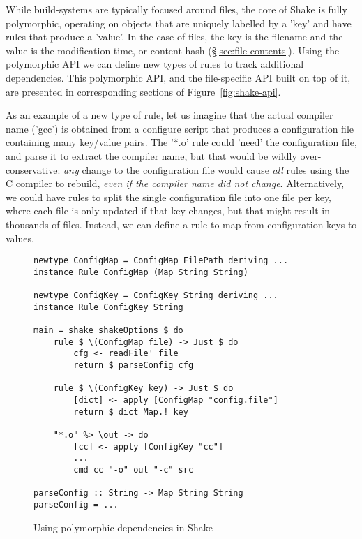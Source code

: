 While build-systems are typically focused around files, the core of Shake is
fully polymorphic, operating on objects that are uniquely labelled by a
\lst'key' and have rules that produce a \lst'value'.
In the case of files, the key is the filename and the value is the modification
time, or content hash (\S\ref{sec:file-contents}).
Using the polymorphic API we can define new types of rules to track additional
dependencies.
This polymorphic API, and the file-specific API built on top
of it, are presented in corresponding sections of Figure~\ref{fig:shake-api}.

As an example of a new type of rule, let us imagine that the actual compiler
name (\lst'gcc') is obtained from a configure script that produces a
configuration file containing many key/value pairs. The \lst'*.o' rule could
\lst'need' the configuration file, and parse it to extract the compiler name,
but that would be wildly over-conservative: \emph{any} change to the
configuration file would cause \emph{all} rules using the C compiler to rebuild,
\emph{even if the compiler name did not change}. Alternatively, we could have rules to split
the single configuration file into one file per key, where each file is only
updated if that key changes, but that might result in thousands of files.
Instead, we can define a rule to map from configuration keys to values.

\begin{figure}
\begin{lstlisting}
newtype ConfigMap = ConfigMap FilePath deriving ...
instance Rule ConfigMap (Map String String)

newtype ConfigKey = ConfigKey String deriving ...
instance Rule ConfigKey String

main = shake shakeOptions $ do
    rule $ \(ConfigMap file) -> Just $ do
        cfg <- readFile' file
        return $ parseConfig cfg

    rule $ \(ConfigKey key) -> Just $ do
        [dict] <- apply [ConfigMap "config.file"]
        return $ dict Map.! key

    "*.o" %> \out -> do
        [cc] <- apply [ConfigKey "cc"]
        ...
        cmd cc "-o" out "-c" src

parseConfig :: String -> Map String String
parseConfig = ...
\end{lstlisting}
\caption{Using polymorphic dependencies in Shake\label{fig:polymorphic-deps}}
\vspace{-3mm}
\end{figure}


